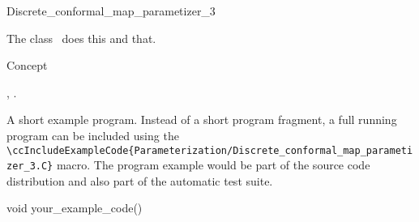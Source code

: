 

\begin{ccRefClass}{Discrete_conformal_map_parametizer_3}  %


\ccDefinition
  
The class \ccRefName\ does this and that.


\ccIsModel

Concept

\ccTypes


\ccCreation
{}  %


\ccOperations


\ccSeeAlso

,
.

\ccExample

A short example program.
Instead of a short program fragment, a full running program can be
included using the 
\verb|\ccIncludeExampleCode{Parameterization/Discrete_conformal_map_parametizer_3.C}| 
macro. The program example would be part of the source code distribution and
also part of the automatic test suite.

\begin{ccExampleCode}
void your_example_code() {
}
\end{ccExampleCode}


\end{ccRefClass}


